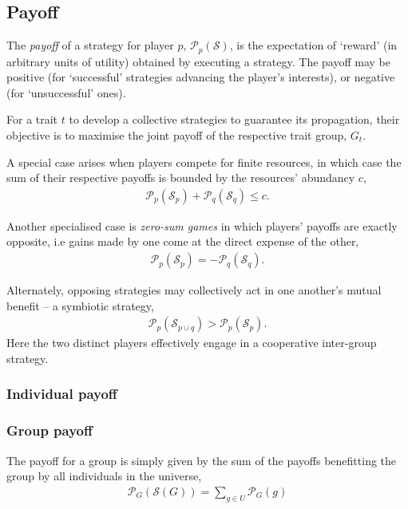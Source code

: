 \documentclass[aps,rmp,twocolumn,amsmath,amssymb,nofootinbib,superscriptaddress]{revtex4}
\begin{document}
\subsection{Payoff}

The \textit{payoff} of a strategy for player $p$, $\mathcal{P}_p(\mathcal{S})$, is the expectation of `reward' (in arbitrary units of utility) obtained by executing a strategy. The payoff may be positive (for `successful' strategies advancing the player's interests), or negative (for `unsuccessful' ones).

For a trait $t$ to develop a collective strategies to guarantee its propagation, their objective is to maximise the joint payoff of the respective trait group, $G_t$.

A special case arises when players compete for finite resources, in which case the sum of their respective payoffs is bounded by the resources' abundancy $c$,
\begin{align}
	\mathcal{P}_p(\mathcal{S}_p) + \mathcal{P}_q(\mathcal{S}_q) \leq c.
\end{align}

Another specialised case is \textit{zero-sum games} in which players' payoffs are exactly opposite, i.e gains made by one come at the direct expense of the other,
\begin{align}
\mathcal{P}_p(\mathcal{S}_p) = -\mathcal{P}_q(\mathcal{S}_q).
\end{align}

Alternately, opposing strategies may collectively act in one another's mutual benefit -- a symbiotic strategy,
\begin{align}
\mathcal{P}_p(\mathcal{S}_{p\cup q}) > \mathcal{P}_p(\mathcal{S}_p).
\end{align}
Here the two distinct players effectively engage in a cooperative inter-group strategy.

\subsubsection{Individual payoff}

\subsubsection{Group payoff}

The payoff for a group is simply given by the sum of the payoffs benefitting the group by all individuals in the universe,
\begin{align}
	\mathcal{P}_{G}(\mathcal{S}(G)) = \sum_{g\in U} \mathcal{P}_G(g)
\end{align}
\end{document}
